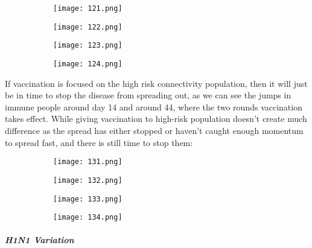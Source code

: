 \documentclass[titlepage]{article}
\begin{document}
\begin{figure}[H]
       \centering
       \begin{subfigure}{0.48\textwidth}
       \centering
       \texttt{[image: 121.png]}
       \end{subfigure}\quad
       \begin{subfigure}{0.48\textwidth}
       \centering
       \texttt{[image: 122.png]}
       \end{subfigure}
              \begin{subfigure}{0.48\textwidth}
       \centering
       \texttt{[image: 123.png]}
       \end{subfigure}\quad
       \begin{subfigure}{0.48\textwidth}
       \centering
       \texttt{[image: 124.png]}
       \end{subfigure}
\end{figure}

If vaccination is focused on the high risk connectivity population, then it will just be in time to stop the disease from spreading out, as we can see the jumps in immune people around day 14 and around 44, where the two rounds vaccination takes effect. While giving vaccination to high-risk population doesn't create much difference as the spread has either stopped or haven't caught enough momentum to spread fast, and there is still time to stop them:


\begin{figure}[H]
       \centering
       \begin{subfigure}{0.48\textwidth}
       \centering
       \texttt{[image: 131.png]}
       \end{subfigure}\quad
       \begin{subfigure}{0.48\textwidth}
       \centering
       \texttt{[image: 132.png]}
       \end{subfigure}
              \begin{subfigure}{0.48\textwidth}
       \centering
       \texttt{[image: 133.png]}
       \end{subfigure}\quad
       \begin{subfigure}{0.48\textwidth}
       \centering
       \texttt{[image: 134.png]}
       \end{subfigure}
\end{figure}

\subparagraph{H1N1 Variation}
\end{document}
